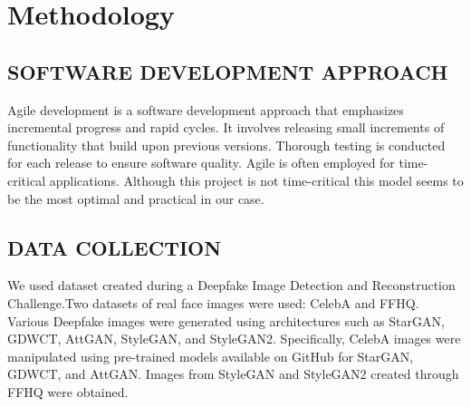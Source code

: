     \chapter{Methodology}
       \section{SOFTWARE DEVELOPMENT APPROACH}
        Agile development is a software development approach that emphasizes incremental progress and rapid cycles. It involves releasing small increments of functionality that build upon previous versions. Thorough testing is conducted for each release to ensure software quality. Agile is often employed for time-critical applications. Although this project is not time-critical this model seems to be the most optimal and practical in our case.
        \begin{figure}[hbt!]
        \end{figure}
        \section{DATA COLLECTION}
        We used dataset created during a Deepfake Image Detection and Reconstruction Challenge.Two datasets of real face images were used: CelebA and FFHQ. Various Deepfake images were generated using architectures such as StarGAN, GDWCT, AttGAN, StyleGAN, and StyleGAN2. Specifically, CelebA images were manipulated using pre-trained models available on GitHub for StarGAN, GDWCT, and AttGAN. Images from StyleGAN and StyleGAN2 created through FFHQ were obtained.
        
